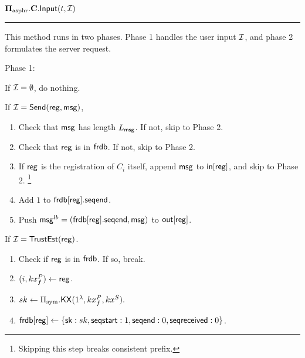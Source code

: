 \begin{definition}
\vspace{10pt}
$\mathbf{\Pi_{\text{asphr}}.C.\mathsf{Input}}(t, \mathcal{I})$
\vspace{5pt}
\hrule
\vspace{5pt}
This method runs in two phases. Phase 1 handles the user input $\mathcal{I}$, and phase 2 formulates the server request.

Phase 1: 

If $\mathcal{I} = \emptyset$, do nothing. 

If $\mathcal{I} = \mathsf{Send}(\mathsf{reg}, \mathsf{msg})$, 

\begin{enumerate}
    \item Check that $\mathsf{msg}$ has length $L_{\mathsf{msg}}$. If not, skip to Phase 2.
    \item Check that $\mathsf{reg}$ is in $\mathsf{frdb}$. If not, skip to Phase 2.
    \item If $\mathsf{reg}$ is the registration of $C_i$ itself, append $\mathsf{msg}$ to $\mathsf{in}[\mathsf{reg}]$, and skip to Phase 2. \footnote{Skipping this step breaks consistent prefix.}
    \item Add $1$ to $\mathsf{frdb}[\mathsf{reg}].\mathsf{seqend}$. 
    \item Push $\mathsf{msg}^{lb} = (\mathsf{frdb}[\mathsf{reg}].\mathsf{seqend}, \mathsf{msg})$ to $\mathsf{out}[\mathsf{reg}]$.
\end{enumerate}

If $\mathcal{I} = \mathsf{TrustEst}(\mathsf{reg})$.
\begin{enumerate}
    \item Check if $\mathsf{reg}$ is in $\mathsf{frdb}$. If so, break.
    \item $(i, kx_f^P) \leftarrow \mathsf{reg}$.
    \item $sk \leftarrow \Pi_{\text{sym}}.\mathsf{KX}(1^{\lambda}, kx_f^P, kx^S).$
    \item $\mathsf{frdb}[\mathsf{reg}] \leftarrow \{{\mathsf{sk}}: sk,  \mathsf{seqstart}: 1, \mathsf{seqend}: 0, \mathsf{seqreceived}: 0\}$.
\end{enumerate}


\end{definition}
